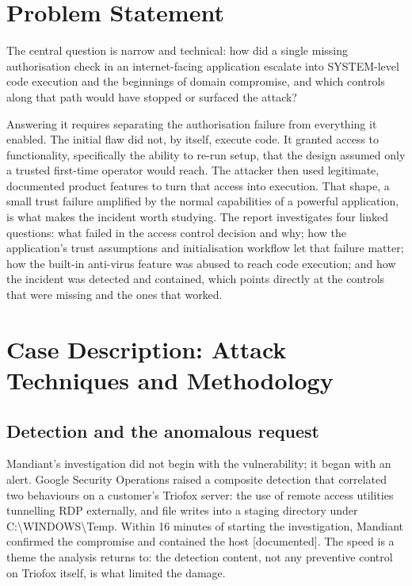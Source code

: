 \documentclass[11pt,a4paper]{article}
\newcommand{\code}[1]{{\small\ttfamily #1}}
\newcommand{\tier}[1]{{\small\color{meta}\textsf{[#1]}}}
\begin{document}
\section{Problem Statement}

The central question is narrow and technical: how did a single missing authorisation check in an internet-facing application escalate into \code{SYSTEM}-level code execution and the beginnings of domain compromise, and which controls along that path would have stopped or surfaced the attack?

Answering it requires separating the authorisation failure from everything it enabled. The initial flaw did not, by itself, execute code. It granted access to functionality, specifically the ability to re-run setup, that the design assumed only a trusted first-time operator would reach. The attacker then used legitimate, documented product features to turn that access into execution. That shape, a small trust failure amplified by the normal capabilities of a powerful application, is what makes the incident worth studying. The report investigates four linked questions: what failed in the access control decision and why; how the application's trust assumptions and initialisation workflow let that failure matter; how the built-in anti-virus feature was abused to reach code execution; and how the incident was detected and contained, which points directly at the controls that were missing and the ones that worked.

\section{Case Description: Attack Techniques and Methodology}

\subsection{Detection and the anomalous request}

Mandiant's investigation did not begin with the vulnerability; it began with an alert. Google Security Operations raised a composite detection that correlated two behaviours on a customer's Triofox server: the use of remote access utilities tunnelling RDP externally, and file writes into a staging directory under \code{C:\textbackslash WINDOWS\textbackslash Temp}. Within 16 minutes of starting the investigation, Mandiant confirmed the compromise and contained the host \tier{documented}. The speed is a theme the analysis returns to: the detection content, not any preventive control on Triofox itself, is what limited the damage.
\end{document}
